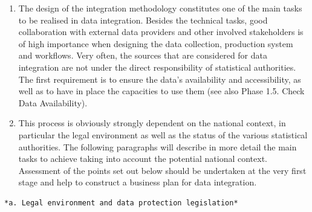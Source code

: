 \documentclass[
]{article}
\begin{document}
\begin{enumerate}
\def\labelenumi{\arabic{enumi}.}
\setcounter{enumi}{202}
\item
  The design of the integration methodology constitutes one of the
  main tasks to be realised in data integration. Besides the technical
  tasks, good collaboration with external data providers and other
  involved stakeholders is of high importance when designing the data
  collection, production system and workflows. Very often, the sources
  that are considered for data integration are not under the direct
  responsibility of statistical authorities. The first requirement is
  to ensure the data's availability and accessibility, as well as to
  have in place the capacities to use them (see also Phase 1.5. Check
  Data Availability).
\item
  This process is obviously strongly dependent on the national
  context, in particular the legal environment as well as the status
  of the various statistical authorities. The following paragraphs
  will describe in more detail the main tasks to achieve taking into
  account the potential national context. Assessment of the points set
  out below should be undertaken at the very first stage and help to
  construct a business plan for data integration.
\end{enumerate}

\begin{verbatim}
*a. Legal environment and data protection legislation*
\end{verbatim}
\end{document}
